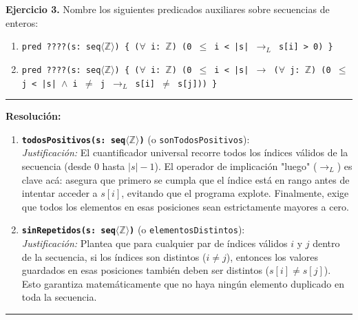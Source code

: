 \hypertarget{ej3}{}
\noindent \textbf{Ejercicio 3.} Nombre los siguientes predicados auxiliares sobre secuencias de enteros:

\begin{enumerate}[label=\alph*)]
    \item \texttt{pred ????(s: seq$\langle\mathbb{Z}\rangle$) \{ ($\forall$ i: $\mathbb{Z}$) (0 $\leq$ i < |s| $\rightarrow_L$ s[i] > 0) \}}
    \item \texttt{pred ????(s: seq$\langle\mathbb{Z}\rangle$) \{ ($\forall$ i: $\mathbb{Z}$) (0 $\leq$ i < |s| $\rightarrow$ ($\forall$ j: $\mathbb{Z}$) (0 $\leq$ j < |s| $\wedge$ i $\neq$ j $\rightarrow_L$ s[i] $\neq$ s[j])) \}}
\end{enumerate}

\vspace{0.2cm}
{\color{gray}\hrule}
\vspace{0.4cm}

\textbf{Resolución:}

\begin{enumerate}[label=\textbf{\alph*)}]

    \item \textbf{\texttt{todosPositivos(s: seq$\langle\mathbb{Z}\rangle$)}} (o \texttt{sonTodosPositivos}): \\
    \textit{Justificación:} El cuantificador universal recorre todos los índices válidos de la secuencia (desde $0$ hasta $|s|-1$). El operador de implicación "luego" ($\rightarrow_L$) es clave acá: asegura que primero se cumpla que el índice está en rango antes de intentar acceder a $s[i]$, evitando que el programa explote. Finalmente, exige que todos los elementos en esas posiciones sean estrictamente mayores a cero.

    \vspace{0.4cm}
    \item \textbf{\texttt{sinRepetidos(s: seq$\langle\mathbb{Z}\rangle$)}} (o \texttt{elementosDistintos}): \\
    \textit{Justificación:} Plantea que para cualquier par de índices válidos $i$ y $j$ dentro de la secuencia, si los índices son distintos ($i \neq j$), entonces los valores guardados en esas posiciones también deben ser distintos ($s[i] \neq s[j]$). Esto garantiza matemáticamente que no haya ningún elemento duplicado en toda la secuencia.

\end{enumerate}

\vspace{0.5cm}
\hrule
\vspace{0.5cm}